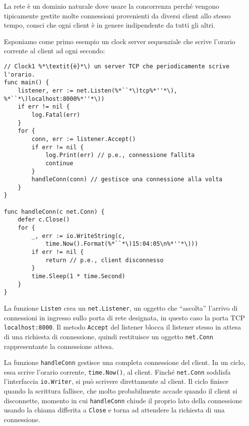%
La rete è un dominio naturale dove usare la concorrenza perché vengono tipicamente gestite molte connessioni provenienti da diversi client allo stesso tempo, consci che ogni client è in genere indipendente da tutti gli altri.

Esponiamo come primo esempio un clock server sequenziale che scrive l'orario corrente al client ad ogni secondo:
\begin{lstlisting}[frame=single, label={lst:lstlisting7-2.1}]
// Clock1 %*\textit{è}*\) un server TCP che periodicamente scrive l'orario.
func main() {
    listener, err := net.Listen(%*``*\)tcp%*''*\), %*``*\)localhost:8000%*''*\))
    if err != nil {
        log.Fatal(err)
    }
    for {
        conn, err := listener.Accept()
        if err != nil {
            log.Print(err) // p.e., connessione fallita
            continue
        }
        handleConn(conn) // gestisce una connessione alla volta
    }
}

func handleConn(c net.Conn) {
    defer c.Close()
    for {
        _, err := io.WriteString(c,
            time.Now().Format(%*``*\)15:04:05\n%*''*\)))
        if err != nil {
            return // p.e., client disconnesso
        }
        time.Sleep(1 * time.Second)
    }
}
\end{lstlisting}
La funzione \verb|Listen| crea un \verb|net.Listener|, un oggetto che ``ascolta'' l'arrivo di connessioni in ingresso sullo porta di rete designata, in questo caso la porta TCP \verb|localhost:8000|.
Il metodo \verb|Accept| del listener blocca il listener stesso in attesa di una richiesta di connessione, quindi restituisce un oggetto \verb|net.Conn| rappresentante la connessione attesa.

La funzione \verb|handleConn| gestisce una completa connessione del client.
In un ciclo, essa scrive l'orario corrente, \verb|time.Now()|, al client.
Finché \verb|net.Conn| soddisfa l'interfaccia \verb|io.Writer|, si può scrivere direttamente al client.
Il ciclo finisce quando la scrittura fallisce, che molto probabilmente accade quando il client si disconnette, momento in cui \verb|handleConn| chiude il proprio lato della connessione usando la chiama differita a \verb|Close| e torna ad attendere la richiesta di una connessione.

